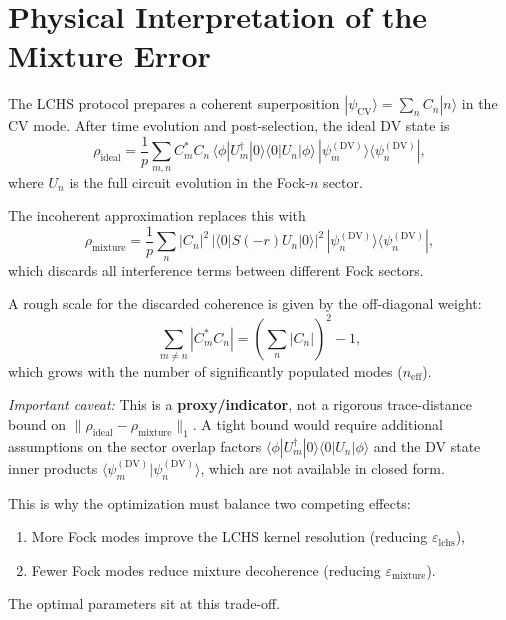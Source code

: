 \documentclass[11pt]{article}
\newcommand{\ket}[1]{|{#1}\rangle}
\newcommand{\bra}[1]{\langle{#1}|}
\newcommand{\braket}[2]{\langle{#1}|{#2}\rangle}
\newcommand{\norm}[1]{\|{#1}\|}
\newcommand{\abs}[1]{|{#1}|}
\newcommand{\eps}{\varepsilon}
\begin{document}
\section{Physical Interpretation of the Mixture Error}

The LCHS protocol prepares a coherent superposition
$\ket{\psi_{\mathrm{CV}}} = \sum_n C_n\ket{n}$ in the CV mode.  After time evolution
and post-selection, the ideal DV state is
\begin{equation}
\rho_{\mathrm{ideal}} = \frac{1}{p}\sum_{m,n} C_m^* C_n\,
\bra{\phi}U_m^\dagger\ket{0}\!\bra{0}U_n\ket{\phi}\,
\ket{\psi_m^{(\mathrm{DV})}}\!\bra{\psi_n^{(\mathrm{DV})}},
\end{equation}
where $U_n$ is the full circuit evolution in the Fock-$n$ sector.

The incoherent approximation replaces this with
\begin{equation}
\rho_{\mathrm{mixture}} = \frac{1}{p}\sum_{n} |C_n|^2\,
\abs{\bra{0}S(-r)U_n\ket{0}}^2\,
\ket{\psi_n^{(\mathrm{DV})}}\!\bra{\psi_n^{(\mathrm{DV})}},
\end{equation}
which discards all interference terms between different Fock sectors.

A rough scale for the discarded coherence is given by the off-diagonal weight:
\begin{equation}
\sum_{m\neq n}\abs{C_m^* C_n}
= \left(\sum_n\abs{C_n}\right)^2 - 1,
\end{equation}
which grows with the number of significantly populated modes ($n_{\mathrm{eff}}$).

\emph{Important caveat:} This is a \textbf{proxy/indicator}, not a rigorous
trace-distance bound on $\norm{\rho_{\mathrm{ideal}} - \rho_{\mathrm{mixture}}}_1$.
A tight bound would require additional assumptions on the sector overlap factors
$\bra{\phi}U_m^\dagger\ket{0}\!\bra{0}U_n\ket{\phi}$ and the DV state inner
products $\braket{\psi_m^{(\mathrm{DV})}}{\psi_n^{(\mathrm{DV})}}$, which are
not available in closed form.

This is why the optimization must balance two competing effects:
\begin{enumerate}
\item More Fock modes improve the LCHS kernel resolution (reducing $\eps_{\mathrm{lchs}}$),
\item Fewer Fock modes reduce mixture decoherence (reducing $\eps_{\mathrm{mixture}}$).
\end{enumerate}
The optimal parameters sit at this trade-off.
\end{document}
